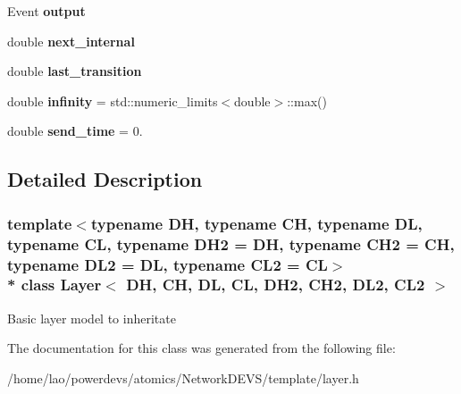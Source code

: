 \begin{DoxyCompactItemize}
\item 
Event {\bfseries output}\hypertarget{classLayer_a3701dfd2133046db9c6e5ee4280a0b59}{}\label{classLayer_a3701dfd2133046db9c6e5ee4280a0b59}

\item 
double {\bfseries next\+\_\+internal}\hypertarget{classLayer_a34f12ad31909eb23876f11bd414c5a87}{}\label{classLayer_a34f12ad31909eb23876f11bd414c5a87}

\item 
double {\bfseries last\+\_\+transition}\hypertarget{classLayer_a4159d408eff834a4e80439a0d05fcddd}{}\label{classLayer_a4159d408eff834a4e80439a0d05fcddd}

\item 
double {\bfseries infinity} = std\+::numeric\+\_\+limits$<$double$>$\+::max()\hypertarget{classLayer_a450c3707171bd64904e6a1fcd5c8de1a}{}\label{classLayer_a450c3707171bd64904e6a1fcd5c8de1a}

\item 
double {\bfseries send\+\_\+time} = 0.\hypertarget{classLayer_adf1d2eddfe40d3b94bd98a10f6226999}{}\label{classLayer_adf1d2eddfe40d3b94bd98a10f6226999}

\end{DoxyCompactItemize}


\subsection{Detailed Description}
\subsubsection*{template$<$typename DH, typename CH, typename DL, typename CL, typename D\+H2 = DH, typename C\+H2 = CH, typename D\+L2 = DL, typename C\+L2 = CL$>$\\*
class Layer$<$ D\+H, C\+H, D\+L, C\+L, D\+H2, C\+H2, D\+L2, C\+L2 $>$}

Basic layer model to inheritate 

The documentation for this class was generated from the following file\+:\begin{DoxyCompactItemize}
\item 
/home/lao/powerdevs/atomics/\+Network\+D\+E\+V\+S/template/layer.\+h\end{DoxyCompactItemize}
